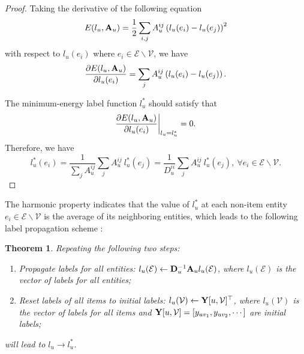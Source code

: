 \documentclass[sigconf]{acmart}
\newtheorem{theorem}{Theorem}
\begin{document}
		\begin{proof}
			Taking the derivative of the following equation
			\begin{equation*}
				E(l_u, {\bf A}_u) = \frac{1}{2} \sum_{i, j} A_u^{ij} \left( l_u(e_i) - l_u(e_j) \right)^2
			\end{equation*}
			with respect to $l_u(e_i)$ where $e_i \in \mathcal E \backslash \mathcal V$, we have
			\begin{equation*}
				\frac{\partial E(l_u, {\bf A}_u)}{\partial l_u(e_i)} = \sum_{j} A_u^{ij} \left( l_u(e_i) - l_u(e_j) \right).
			\end{equation*}
			
			The minimum-energy label function $l_u^*$ should satisfy that
			\begin{equation*}
				\frac{\partial E(l_u, {\bf A}_u)}{\partial l_u(e_i)} \bigg |_{l_u = l_u^*} = 0.
			\end{equation*}
			Therefore, we have
			\begin{equation*}
				l_u^*(e_i) = \frac{1}{\sum_{j} A_u^{ij}} \sum_{j} A_u^{ij} \ l_u^*(e_j) = \frac{1}{D_u^{ii}} \sum_{j} A_u^{ij} \ l_u^*(e_j), \ \forall e_i \in \mathcal E \backslash \mathcal V.
			\end{equation*}
		\end{proof}
		
		The harmonic property indicates that the value of $l_u^*$ at each non-item entity $e_i \in \mathcal E \backslash \mathcal V$ is the average of its neighboring entities, which leads to the following label propagation scheme \cite{zhu2005semi}:
		
		\begin{theorem}
		\label{thm:2}
			Repeating the following two steps:
			\begin{enumerate}
				\item Propagate labels for all entities: $l_u(\mathcal E) \leftarrow {\bf D}_u^{-1} {\bf A}_u l_u(\mathcal E)$, where $l_u(\mathcal E)$ is the vector of labels for all entities;
				\item Reset labels of all items to initial labels: $l_u(\mathcal V) \leftarrow {\bf Y}[u, \mathcal V]^\top$, where $l_u(\mathcal V)$ is the vector of labels for all items and ${\bf Y}[u, \mathcal V]=[y_{uv_1}, y_{uv_2}, \cdots]$ are initial labels;
			\end{enumerate}
			will lead to $l_u \rightarrow l_u^*$.
		\end{theorem}
		
\end{document}

